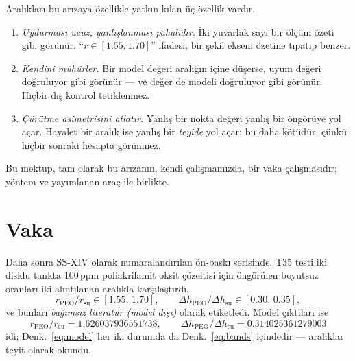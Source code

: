 \documentclass[11pt,a4paper]{article}
\begin{document}
Aralıkları bu arızaya özellikle yatkın kılan üç özellik vardır.
\begin{enumerate}
    \item \emph{Uydurması ucuz, yanlışlanması pahalıdır.} İki yuvarlak sayı
    bir ölçüm özeti gibi görünür. ``$r \in [1.55,1.70]$'' ifadesi, bir
    şekil ekseni özetine tıpatıp benzer.
    \item \emph{Kendini mühürler.} Bir model değeri aralığın içine düşerse,
    uyum değeri doğruluyor gibi görünür — ve değer de modeli doğruluyor
    gibi görünür. Hiçbir dış kontrol tetiklenmez.
    \item \emph{Çürütme asimetrisini atlatır.} Yanlış bir nokta değeri yanlış
    bir öngörüye yol açar. Hayalet bir aralık ise yanlış bir \emph{teyide}
    yol açar; bu daha kötüdür, çünkü hiçbir sonraki hesapta görünmez.
\end{enumerate}
Bu mektup, tam olarak bu arızanın, kendi çalışmamızda, bir vaka çalışmasıdır;
yöntem ve yayımlanan araç ile birlikte.

\section{Vaka}
Daha sonra SS-XIV olarak numaralandırılan ön-baskı serisinde, T35 testi iki
disklu tankta 100\,ppm poliakrilamit oksit çözeltisi için öngörülen boyutsuz
oranları iki alıntılanan aralıkla karşılaştırdı,
\begin{equation}
\label{eq:bands}
r_{\mathrm{PEO}}/r_{\mathrm{su}} \in [1.55,\,1.70],
\qquad
\Delta h_{\mathrm{PEO}}/\Delta h_{\mathrm{su}} \in [0.30,\,0.35],
\end{equation}
ve bunları \emph{bağımsız literatür (model dışı)} olarak etiketledi. Model
çıktıları ise
\begin{equation}
\label{eq:model}
r_{\mathrm{PEO}}/r_{\mathrm{su}} = 1.626037936551738,
\qquad
\Delta h_{\mathrm{PEO}}/\Delta h_{\mathrm{su}} = 0.314025361279003
\end{equation}
idi; Denk.~\eqref{eq:model} her iki durumda da Denk.~\eqref{eq:bands} içindedir
--- aralıklar teyit olarak okundu.
\end{document}
